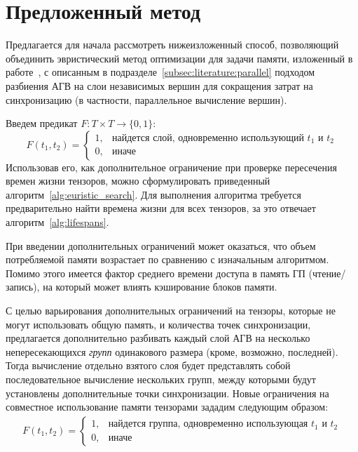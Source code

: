 
\section{Предложенный метод}\label{sec:method}

Предлагается для начала рассмотреть нижеизложенный способ, позволяющий
объединить эвристический метод оптимизации для задачи памяти, изложенный в
работе~\cite{pisarchyk2020efficient}, с описанным в
подразделе~\ref{subsec:literature:parallel} подходом разбиения АГВ на слои
независимых вершин для сокращения затрат на синхронизацию (в частности,
параллельное вычисление вершин).

Введем предикат $F: T\times T \rightarrow \{0,1\}$:
$$F(t_1, t_2) =
\begin{cases}
1, &\text{найдется слой, одновременно использующий $t_1$ и $t_2$}\\
0, &\text{иначе} \end{cases}$$ Использовав его, как дополнительное ограничение
при проверке пересечения времен жизни тензоров, можно сформулировать приведенный
алгоритм~\ref{alg:euristic_search}. Для выполнения алгоритма требуется
предварительно найти времена жизни для всех тензоров, за это отвечает
алгоритм~\ref{alg:lifespans}.

При введении дополнительных ограничений может оказаться, что объем потребляемой
памяти возрастает по сравнению с изначальным алгоритмом. Помимо этого имеется
фактор среднего времени доступа в память ГП (чтение/запись), на который может
влиять кэширование блоков памяти.

С целью варьирования дополнительных ограничений на тензоры, которые не могут
использовать общую память, и количества точек синхронизации, предлагается
дополнительно разбивать каждый слой АГВ на несколько непересекающихся
\textit{групп} одинакового размера (кроме, возможно, последней). Тогда
вычисление отдельно взятого слоя будет представлять собой последовательное
вычисление нескольких групп, между которыми будут установлены дополнительные
точки синхронизации. Новые ограничения на совместное использование памяти
тензорами зададим следующим образом:
\begin{gather*}
    F(t_1, t_2) = \begin{cases}
    1, &\text{найдется группа, одновременно использующая $t_1$ и $t_2$}\\
    0, &\text{иначе} \end{cases}
\end{gather*}

